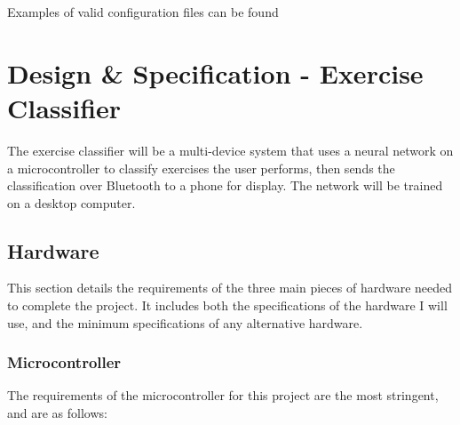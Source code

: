 \documentclass[a4paper]{article}
\begin{document}
Examples of valid configuration files can be found 

\newpage
\section{Design \& Specification - Exercise Classifier}

The exercise classifier will be a multi-device system that uses a neural network on a microcontroller to classify exercises the user performs, then sends the classification over Bluetooth to a phone for display. The network will be trained on a desktop computer.


\subsection{Hardware}%

This section details the requirements of the three main pieces of hardware needed to complete the project. It includes both the specifications of the hardware I will use, and the minimum specifications of any alternative hardware.

\subsubsection{Microcontroller}

The requirements of the microcontroller for this project are the most stringent, and are as follows:

\end{document}
